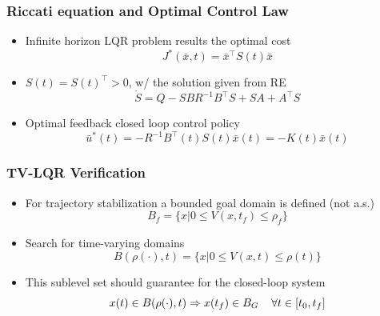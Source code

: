 \documentclass{beamer}
\begin{document}
\begin{frame}
\frametitle{Riccati equation and Optimal Control Law}
\begin{itemize}
\item Infinite horizon LQR problem results the optimal cost
\begin{equation*}
J^{\ast}(\bar{x},t)=\bar{x}^{\intercal}S(t)\bar{x}
\end{equation*} 
\item $S(t)=S(t)^{\intercal} > 0$, w/ the solution given from RE
\begin{equation*}
\dot{S}=Q-SBR^{-1}B^{\intercal}S+SA+A^{\intercal}S
\end{equation*}
\item Optimal feedback closed loop control policy 
\begin{equation*}
\bar{u}^{\ast}(t)=-R^{-1}B^{\intercal}(t)S(t)\bar{x}(t)=-K(t)\bar{x}(t)
\end{equation*}
\end{itemize}
\end{frame}

\begin{frame}
\frametitle{TV-LQR Verification}
\begin{itemize}
\item For trajectory stabilization a bounded goal domain is defined (not a.s.)
\begin{equation*}
B_f=\{ x|0\leq V(x,t_f) \leq \rho_f \} 
\end{equation*} 
\item Search for time-varying domains 
\begin{equation*}
B(\rho (\cdot ), t)=\{ x|0\leq V(x,t) \leq \rho (t) \} 
\end{equation*} 
\item This sublevel set should guarantee for the closed-loop system
\begin{equation*}
x(t) \in B( \rho (\cdot ), t) \Rightarrow x(t_f) \in B_G \hspace{.4cm} \forall t \in [ t_0, t_f ]
\end{equation*}
\end{itemize}

\end{frame}

\end{document}

